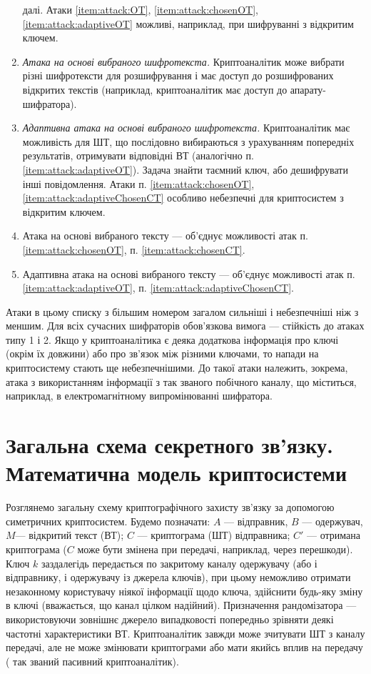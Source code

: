 \begin{enumerate}
    далі. Атаки \ref{item:attack:OT}, \ref{item:attack:chosenOT},
    \ref{item:attack:adaptiveOT} можливі, наприклад, при шифруванні з відкритим
    ключем.  \item\label{item:attack:chosenCT} \textit{Атака на основі
    вибраного шифротекста.} Криптоаналітик може вибрати різні шифротексти для
    розшифрування і має доступ до розшифрованих відкритих текстів (наприклад,
    криптоаналітик має доступ до апарату-шифратора).
\item\label{item:attack:adaptiveChosenCT} \textit{Адаптивна атака на основі
    вибраного шифротекста.} Криптоаналітик має можливість для ШТ, що послідовно
    вибираються з урахуванням попередніх результатів, отримувати відповідні ВТ
    (аналогічно п. \ref{item:attack:adaptiveOT}). Задача знайти таємний ключ,
    або дешифрувати інші повідомлення. Атаки п. \ref{item:attack:chosenOT},
    \ref{item:attack:adaptiveChosenCT} особливо небезпечні для криптосистем з
    відкритим ключем.  \item Атака на основі вибраного тексту  --- об'єднує
    можливості атак п. \ref{item:attack:chosenOT}, п.
    \ref{item:attack:chosenCT}.  \item Адаптивна атака на основі вибраного
    тексту  --- об'єднує можливості атак п. \ref{item:attack:adaptiveOT},
    п. \ref{item:attack:adaptiveChosenCT}.
\end{enumerate}

Атаки в цьому списку з більшим номером загалом сильніші і небезпечніші ніж з
меншим. Для всіх сучасних шифраторів обов'язкова вимога --- стійкість до атаках
типу 1 і 2. Якщо у криптоаналітика є деяка додаткова інформація про ключі
(окрім їх довжини) або про зв'язок між різними ключами, то напади на
криптосистему  стають ще небезпечнішими. До такої атаки належить, зокрема, атака
з використанням інформації з так званого побічного каналу, що міститься,
наприклад, в електромагнітному випромінюванні шифратора.

\section{Загальна схема секретного зв'язку. Математична модель криптосистеми}

Розглянемо загальну схему криптографічного захисту зв’язку за допомогою
симетричних криптосистем.  Будемо позначати: $A$ --- відправник,
$B$ --- одержувач, $M$--- відкритий текст (ВТ); $C$ --- криптограма (ШТ)
відправника; $C'$ --- отримана криптограма ($C$ може бути змінена при передачі,
наприклад, через перешкоди). Ключ $k$ заздалегідь передається по закритому
каналу одержувачу (або і відправнику, і одержувачу із джерела ключів), при
цьому неможливо отримати незаконному користувачу ніякої інформації щодо ключа,
здійснити будь-яку зміну в ключі  (вважається, що канал цілком надійний).
Призначення рандомізатора --- використовуючи  зовнішнє джерело випадковості
попередньо зрівняти деякі частотні характеристики ВТ.  Криптоаналітик завжди
може зчитувати ШТ з каналу передачі, але не може змінювати криптограми або мати
якийсь вплив на передачу ( так званий пасивний криптоаналітик).

